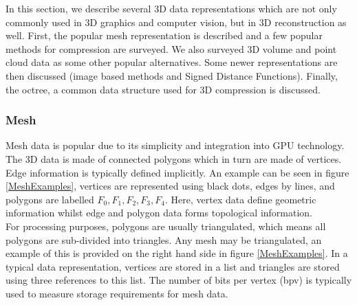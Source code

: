 
In this section, we describe several 3D data representations which are not only commonly used in 3D graphics and computer vision, but in 3D reconstruction as well. First, the popular mesh representation is described and a few popular methods for compression are surveyed. We also surveyed 3D volume and point cloud data as some other popular alternatives. Some newer representations are then discussed (image based methods and Signed Distance Functions). Finally, the octree, a common data structure used for 3D compression is discussed. \\

\subsubsection{Mesh}

Mesh data is popular due to its simplicity and integration into GPU technology. The 3D data is made of connected polygons which in turn are made of vertices. Edge information is typically defined implicitly. An example can be seen in figure \ref{MeshExamples}, vertices are represented using black dots, edges by lines, and polygons are labelled $F_0, F_1, F_2, F_3, F_4$. Here, vertex data define geometric information whilst edge and polygon data forms topological information. \\

For processing purposes, polygons are usually triangulated, which means all polygons are sub-divided into triangles. Any mesh may be triangulated, an example of this is provided on the right hand side in figure \ref{MeshExamples}. In a typical data representation, vertices are stored in a list and triangles are stored using three references to this list. The number of bits per vertex (bpv) is typically used to measure storage requirements for mesh data. \\


